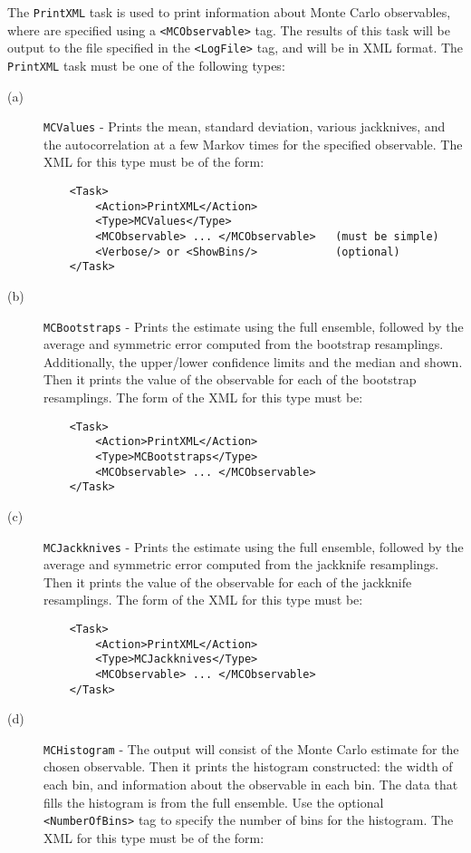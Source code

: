 \documentclass[12pt,notitlepage,letterpaper]{article}
\newcommand{\vb}{\texttt}
\begin{document}
The \vb{PrintXML} task is used to print information about Monte Carlo observables,
where are specified using a \vb{<MCObservable>} tag.
The results of this task will be output to the file specified in the
\vb{<LogFile>} tag, and will be in XML format.
The \vb{PrintXML} task must be one of the following types:
\begin{description}
\item[(a)] \vb{MCValues} - Prints the mean, standard deviation, various jackknives, and
  the autocorrelation at a few Markov times for the specified observable.
  The XML for this type must be of the form:
\begin{verbatim}
    <Task>
        <Action>PrintXML</Action>
        <Type>MCValues</Type>
        <MCObservable> ... </MCObservable>   (must be simple)
        <Verbose/> or <ShowBins/>            (optional)
    </Task>
\end{verbatim}
\item[(b)] \vb{MCBootstraps} - Prints the estimate using the full ensemble, followed by
the average and symmetric error computed from the bootstrap resamplings. Additionally,
the upper/lower confidence limits and the median and shown.
Then it prints the value of the observable for each of the bootstrap resamplings.
The form of the XML for this type must be:
\begin{verbatim}
    <Task>
        <Action>PrintXML</Action>
        <Type>MCBootstraps</Type>
        <MCObservable> ... </MCObservable>
    </Task>
\end{verbatim}
\item[(c)] \vb{MCJackknives} - Prints the estimate using the full ensemble, followed by
the average and symmetric error computed from the jackknife resamplings.
Then it prints the value of the observable for each of the jackknife resamplings.
The form of the XML for this type must be:
\begin{verbatim}
    <Task>
        <Action>PrintXML</Action>
        <Type>MCJackknives</Type>
        <MCObservable> ... </MCObservable>
    </Task>
\end{verbatim}
\item[(d)] \vb{MCHistogram} - The output will consist of the Monte Carlo estimate for the chosen
  observable. Then it prints the histogram constructed: the width of each bin, and information
  about the observable in each bin.
  The data that fills the histogram is from the full ensemble.
  Use the optional \vb{<NumberOfBins>} tag to specify the number of
  bins for the histogram. The XML for this type must be of the form:

\end{description}
\end{document}

